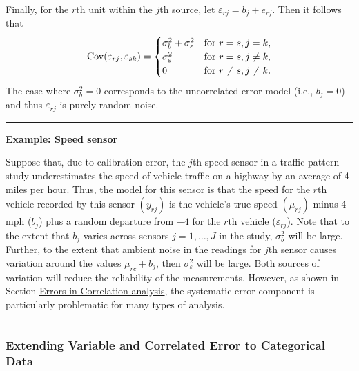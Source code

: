 \documentclass[]{krantz}
\begin{document}
Finally, for the \(r\)th unit within the \(j\)th source, let
\(\varepsilon_{rj} = b_j + e_{rj}\). Then it follows that
\[\label{eq:10-1.2}
\begin{array}{lcl@{\quad}l}
\mathrm{Cov}(\varepsilon_{rj} ,\varepsilon_{sk}) =
\begin{cases}
\sigma_b^2 + \sigma_\varepsilon^2 & \text{for } r = s,j = k, \\
\sigma_\varepsilon^2&\text{for } r = s,j \ne k,  \\
 0 & \text{for } r \ne s,j \ne k.
 \end{cases}
\end{array}\] The case where \(\sigma_b^2 = 0\) corresponds to the
uncorrelated error model (i.e., \(b_j = 0\)) and thus
\(\varepsilon_{rj}\) is purely random noise.

\begin{center}\rule{0.5\linewidth}{\linethickness}\end{center}

\textbf{Example: Speed sensor}

Suppose that, due to calibration error, the \(j\)th speed sensor in a
traffic pattern study underestimates the speed of vehicle traffic on a
highway by an average of 4 miles per hour. Thus, the model for this
sensor is that the speed for the \(r\)th vehicle recorded by this sensor
\((y_{rj})\) is the vehicle's true speed \((\mu_{rj})\) minus 4 mph
(\(b_{j}\)) plus a random departure from \(-4\) for the \(r\)th vehicle
(\(\varepsilon_{rj}\)). Note that to the extent that \(b_{j}\) varies
across sensors \(j = 1,\ldots ,J\) in the study, \(\sigma_b^2\) will be
large. Further, to the extent that ambient noise in the readings for
\(j\)th sensor causes variation around the values \(\mu_{rc} + b_j\),
then \(\sigma_\varepsilon^2\) will be large. Both sources of variation
will reduce the reliability of the measurements. However, as shown in
Section \protect\hyperlink{sec:10-4.2.4}{Errors in Correlation
analysis}, the systematic error component is particularly problematic
for many types of analysis.

\begin{center}\rule{0.5\linewidth}{\linethickness}\end{center}

\hypertarget{sec:10-4.2.2}{\subsubsection{Extending Variable and
Correlated Error to Categorical Data}\label{sec:10-4.2.2}}
\end{document}
